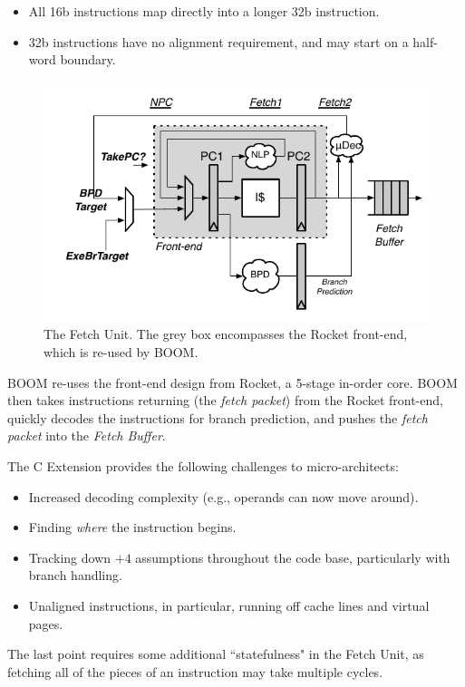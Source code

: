 \begin{itemize}
\item All 16b instructions map directly into a longer 32b instruction. 
\item 32b instructions have no alignment requirement, and may start on a half-word boundary.
\end{itemize}

\begin{figure}[ht]
	\centering
	\centerline{\includegraphics[scale =1] {figures/frontend}}
	\caption{ \small The Fetch Unit. The grey box encompasses the Rocket front-end, which is re-used by BOOM.}
	\label{fig:lsu}
\end{figure}

BOOM re-uses the front-end design from Rocket, a 5-stage in-order core.  BOOM then takes instructions returning (the {\em fetch packet}) from the Rocket front-end, quickly decodes the instructions for branch prediction, and pushes the {\em fetch packet} into the {\em Fetch Buffer}. 


The C Extension provides the following challenges to micro-architects:

\begin{itemize}
\item Increased decoding complexity (e.g., operands can now move around). 
\item Finding {\em where} the instruction begins. 
\item Tracking down $+4$ assumptions throughout the code base, particularly with branch handling.
\item Unaligned instructions, in particular, running off cache lines and virtual pages. 
\end{itemize}

The last point requires some additional ``statefulness" in the Fetch Unit, as fetching all of the pieces of an instruction may take multiple cycles. 

